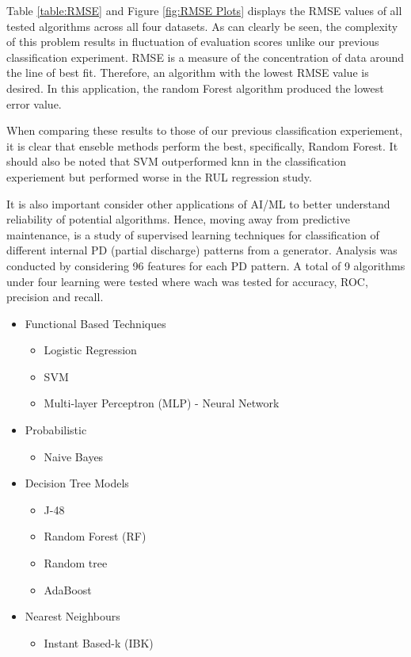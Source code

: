 Table \ref{table:RMSE} and Figure \ref{fig:RMSE Plots} displays the RMSE values of all tested algorithms across all four datasets.
As can clearly be seen, the complexity of this problem results in fluctuation of evaluation scores unlike our previous classification experiment.
RMSE is a measure of the concentration of data around the line of best fit. Therefore, an algorithm with the lowest RMSE value is desired.
In this application, the random Forest algorithm produced the lowest error value.

When comparing these results to those of our previous classification experiement, it is clear that enseble methods perform the best, specifically, Random Forest. 
It should also be noted that SVM outperformed knn in the classification experiement but performed worse in the RUL regression study.

\bigskip
It is also important consider other applications of AI/ML to better understand reliability of potential algorithms.
Hence, moving away from predictive maintenance, \cite{8300383} is a study of supervised learning techniques for classification of different internal PD (partial discharge) patterns from a generator.
Analysis was conducted by considering 96 features for each PD pattern.
A total of 9 algorithms under four learning were tested where wach was tested for accuracy, ROC, precision and recall.

\begin{itemize}
    \item Functional Based Techniques
    \begin{itemize}
        \item Logistic Regression
        \item SVM
        \item Multi-layer Perceptron (MLP) - Neural Network
    \end{itemize}
    \item Probabilistic
    \begin{itemize}
        \item Naive Bayes
    \end{itemize}
    \item Decision Tree Models
    \begin{itemize}
        \item J-48
        \item Random Forest (RF)
        \item Random tree
        \item AdaBoost
    \end{itemize}
    \item Nearest Neighbours
    \begin{itemize}
        \item Instant Based-k (IBK)
    \end{itemize}
\end{itemize}

